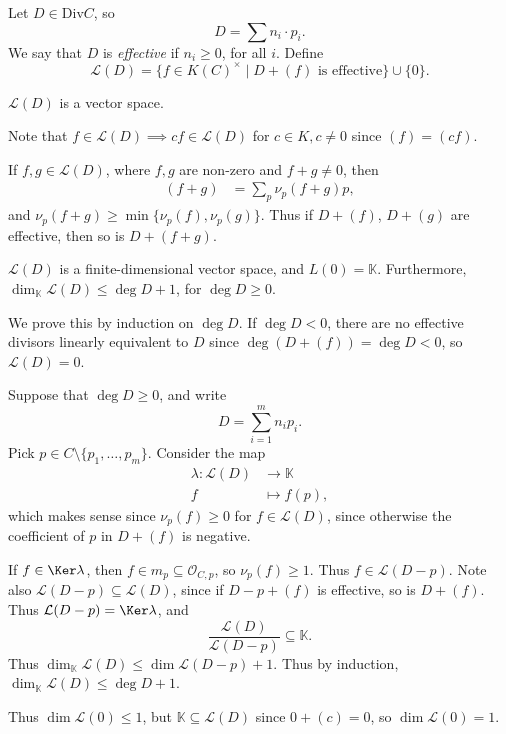 \documentclass[12pt]{article}
\begin{document}
Let $D \in \mathrm{Div} C$, so
\[
D = \sum n_i \cdot p_i.
\]
We say that $D$ is \emph{effective} if $n_i \geq 0$, for all $i$. Define
\[
	\mathcal{L} (D) = \{ f \in K(C)^{\times} \mid D + (f) \text{ is effective}\} \cup \{0\}.
\]

\begin{lemma}
	$\mathcal{L}(D)$ is a vector space.
\end{lemma}

\begin{proofbox}
	Note that $f \in \mathcal{L}(D) \implies cf \in \mathcal{L}(D)$ for $c \in K, c \neq 0$ since $(f) = (cf)$.

	If $f, g \in \mathcal{L}(D)$, where $f, g$ are non-zero and $f + g \neq 0$, then
	\begin{align*}
		(f + g) &= \sum_{p} \nu_p (f + g) p,
	\end{align*}
	and $\nu_p(f + g) \geq \min\{\nu_p(f), \nu_p(g)\}$. Thus if $D + (f)$, $D + (g)$ are effective, then so is $D + (f + g)$.
\end{proofbox}

\begin{theorem}
	$\mathcal{L}(D)$ is a finite-dimensional vector space, and $L(0) = \mathbb{K}$. Furthermore, $\dim_{\mathbb{K}} \mathcal{L}(D) \leq \deg D + 1$, for $\deg D \geq 0$.
\end{theorem}

\begin{proofbox}
	We prove this by induction on $\deg D$. If $\deg D < 0$, there are no effective divisors linearly equivalent to $D$ since $\deg (D + (f)) = \deg D < 0$, so $\mathcal{L}(D) = 0$.

	Suppose that $\deg D \geq 0$, and write
	\[
	D = \sum_{i = 1}^m n_i p_i.
	\]
	Pick $p \in C \setminus \{p_1, \ldots, p_m\}$. Consider the map
	\begin{align*}
		\lambda : \mathcal{L}(D) &\to \mathbb{K} \\
		f &\mapsto f(p),
	\end{align*}
	which makes sense since $\nu_p(f) \geq 0$ for $f \in \mathcal{L}(D)$, since otherwise the coefficient of $p$ in $D + (f)$ is negative.

	If $f \in \Ker \lambda$, then $f \in m_p \subseteq \mathcal{O}_{C, p}$, so $\nu_p(f) \geq 1$. Thus $f \in \mathcal{L}(D - p)$. Note also $\mathcal{L}(D - p) \subseteq \mathcal{L}(D)$, since if $D - p + (f)$ is effective, so is $D + (f)$. Thus $\mathcal{L}(D - p) = \Ker \lambda$, and
	\[
	\frac{\mathcal{L}(D)}{\mathcal{L}(D - p)} \subseteq \mathbb{K}.
	\]
	Thus $\dim_{\mathbb{K}} \mathcal{L}(D) \leq \dim \mathcal{L}(D - p) + 1$. Thus by induction, $\dim_{\mathbb{K}} \mathcal{L}(D) \leq \deg D + 1$.

	Thus $\dim \mathcal{L}(0) \leq 1$, but $\mathbb{K} \subseteq \mathcal{L}(D)$ since $0 + (c) = 0$, so $\dim \mathcal{L}(0) = 1$.
\end{proofbox}
\end{document}
